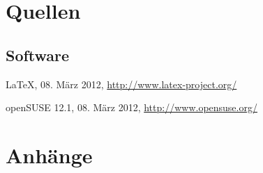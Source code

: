 \documentclass[12pt,        %
  english,ngerman,          %
  paper=a4,                 %
  captions=tablesignature,  %
  listof=numbered,          %
  bibliography=totoc,       %
  headings=small,           %
  headinclude=false,        %
  footinclude=false,        %
  parskip=half-,            %
  oneside,                  %
  DIV=12                    %
  ]{scrbook}                %
\begin{document}
  \cleardoublepage
  \listoftables

  \cleardoublepage
  \lstlistoflistings  %

\chapter{Quellen}


\renewcommand{\bibname}{Literatur}



{}


\section*{Software}

\LaTeX, 08. März 2012, \url{http://www.latex-project.org/}

openSUSE 12.1, 08. März 2012, \url{http://www.opensuse.org/}

\renewcommand{\thechapter}{\Alph{chapter}}
\renewcommand{\thesection}{\Alph{section}}
\renewcommand{\thesubsection}{\Alph{section}.\arabic{subsection}}
\setcounter{section}{0} %
\addtocounter{chapter}{1} %

\chapter{Anhänge}\label{chapter:appendix}
\end{document}
